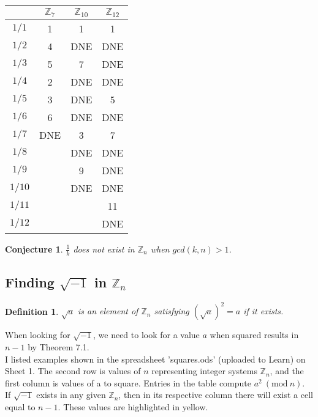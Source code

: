 \documentclass[12pt]{article}
\newcommand{\bZ}{{\mathbb{Z}}}
\newcommand{\Mod}[1]{\ (\mathrm{mod}\ #1)}
\newtheorem{definition}{Definition}[section]
\newtheorem{conj}[theorem]{Conjecture}
\begin{document}
		\begin{table}[h!]
			\centering
			\begin{tabular}{c|c|c|c}
				& $\bZ_7$ & $\bZ_{10}$ & $\bZ_{12}$  \\
				\hline
				$1/1$ & 1     & 1      & 1      \\
				$1/2$ & 4     & DNE    & DNE     \\
				$1/3$  & 5     & 7      & DNE    \\
				$1/4$  & 2     & DNE    & DNE    \\
				$1/5$  & 3     & DNE    & 5      \\
				$1/6$  & 6     & DNE    & DNE    \\
				$1/7$  & DNE   & 3      & 7      \\
				$1/8$  &       & DNE    & DNE    \\
				$1/9$  &       & 9      & DNE    \\
				$1/10$ &       & DNE    & DNE    \\
				$1/11$ &       &        & 11     \\
				$1/12$ &       &        & DNE     
			\end{tabular}
		\end{table}

		\begin{conj}
			$\frac{1}{k}$ does not exist in $\bZ_n$ when $gcd(k, n) > 1$.
		\end{conj}

	\subsection{Finding $\sqrt{-1}$ in $\bZ_n$}

		\begin{definition}
			$\sqrt{a}$ is an element of $\bZ_n$ satisfying $(\sqrt{a})^2 = a$ if it exists.
		\end{definition}

		When looking for $\sqrt{-1}$, we need to look for a value $a$ when squared results in $n-1$ by Theorem 7.1. \\

		I listed examples shown in the spreadsheet 'squares.ods' (uploaded to Learn) on Sheet 1. The second row is values of $n$ representing integer systems $\bZ_n$, and the first column is values of a to square. Entries in the table compute $a^2 \Mod{n}$.\\

		If $\sqrt{-1}$ exists in any given $\bZ_n$, then in its respective column there will exist a cell equal to $n-1$. These values are highlighted in yellow.\\
\end{document}
